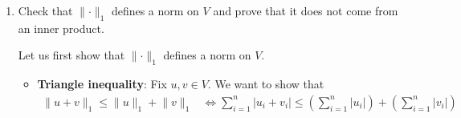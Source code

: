 \documentclass[12pt]{article}
\begin{document}
\begin{enumerate}[label=\alph*)]
\begin{itemize}
\begin{itemize}
            We have additivity and homogeneity in the first variable, so this inner product is linear in the first variable.

            \item \textbf{Linearity in the second variable}: This can easily be shown using symmetry and linearity in the first variable.
        \end{itemize}

        We have shown that $\langle \cdot, \cdot \rangle$ as defined above is an inner product.

        Now, show that $\lVert v \rVert = \sqrt{\langle v, v \rangle}$.
        We have
        $$
            \begin{aligned}
                \langle v, v \rangle &= \frac{1}{2}\left(\lVert v + v \rVert^2 - \lVert v \rVert^2 - \lVert v \rVert^2\right) \\
                        &= \frac{1}{2}\left(\lVert 2v \rVert^2 - 2\lVert v \rVert^2\right) \overset{\text{homogeneity}}= \frac{1}{2}\left(4 \lVert v \rVert^2 - 2\lVert v \rVert^2\right) \\
                        &= \frac{1}{2}2 \lVert v \rVert^2 = \lVert v \rVert^2 \\
                        &\iff \sqrt{\langle v, v \rangle} = \lVert v \rVert
            \end{aligned}
        $$

        Thus, $\lVert v \rVert$ is induced by an inner product. \qed

    \end{itemize}

    \item Check that $\lVert \cdot \rVert_1$ defines a norm on $V$ and prove that it does not come from an inner product.
    
    Let us first show that $\lVert \cdot \rVert_1$ defines a norm on $V$.

    \begin{itemize}
        \item \textbf{Triangle inequality}: Fix $u, v \in V$. We want to show that
        $$
        \begin{aligned}
            \lVert u + v \rVert_1 \leq \lVert u \rVert_1 + \lVert v \rVert_1 &\iff \sum_{i = 1}^{n} |u_i + v_i| \leq \left( \sum_{i = 1}^{n} |u_i| \right) + \left( \sum_{i = 1}^{n} |v_i| \right)\\
        \end{aligned}
        $$


\end{itemize}
\end{enumerate}
\end{document}
